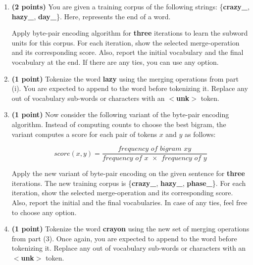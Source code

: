 \documentclass[11pt, letterpaper]{article}
\begin{document}
\begin{enumerate}

    \item \textbf{(2 points)} You are given a training corpus of the following strings: \{\colorbox{blue!10}{\textbf{crazy\_}}, \colorbox{blue!10}{\textbf{hazy\_}}, \colorbox{blue!10}{\textbf{day\_}}\}.  Here, \colorbox{blue!10}{\textbf{\textunderscore}} represents the end of a word.

     Apply byte-pair encoding algorithm for \textbf{three} iterations to learn the subword units for this corpus. For each iteration, show the selected merge-operation and its corresponding score. Also, report the initial vocabulary and the final vocabulary at the end. If there are any ties, you can use any option.
    
    \item \textbf{(1 point)} Tokenize the word \colorbox{blue!10}{\textbf{lazy}} using the merging operations from part (i). You are expected to append  \colorbox{blue!10}{\textbf{\textunderscore}} to the word before tokenizing it. Replace any out of vocabulary sub-words or characters with an \colorbox{blue!10}{\textbf{$<$unk$>$}} token.


     \item \textbf{(1 point)} Now consider the following variant of the byte-pair encoding algorithm. Instead of computing counts to choose the best bigram, the variant computes a score for each pair of tokens $x$ and $y$ as follows:

     \begin{equation*}
        score(x, y) = \frac{\textit{frequency of bigram }\textit{xy}}{\textit{frequency of }\textit{x}\;\;\times\;\;\textit{frequency of }\textit{y}}  
     \end{equation*}

     Apply the new variant of byte-pair encoding on the given sentence for \textbf{three} iterations. The new training corpus is \{\colorbox{blue!10}{\textbf{crazy\_}}, \colorbox{blue!10}{\textbf{hazy\_}}, \colorbox{blue!10}{\textbf{phase\_}}\}. For each iteration, show the selected merge-operation and its corresponding score. Also, report the initial and the final vocabularies. In case of any ties, feel free to choose any option.

   \item \textbf{(1 point)} Tokenize the word \colorbox{blue!10}{\textbf{crayon}} using the new set of merging operations from part (3). Once again, you are expected to append  \colorbox{blue!10}{\textbf{\textunderscore}} to the word before tokenizing it. Replace any out of vocabulary sub-words or characters with an \colorbox{blue!10}{\textbf{$<$unk$>$}} token.

\end{enumerate}
\end{document}
